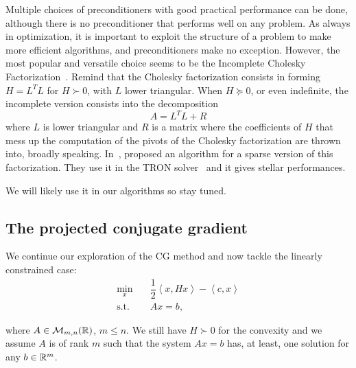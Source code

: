 \documentclass[10pt]{article}
\numberwithin{equation}{section}
\newcommand{\scal}[2]{\left\langle {#1} , {#2} \right\rangle} %
\begin{document}
	 Multiple choices of preconditioners with good practical performance can be done, although there is no preconditioner that performs well on any problem. As always in optimization, it is important to exploit the structure of a problem to make more efficient algorithms, and preconditioners make no exception. However, the most popular and versatile choice seems to be the Incomplete Cholesky Factorization~\cite{golubvanloan:2013}. Remind that the Cholesky factorization consists in forming $H=L^TL$ for $H \succ 0$, with $L$ lower triangular. When $H\succeq 0$, or even indefinite, the incomplete version consists into the decomposition
	 \[A = L^TL+R\]
	 where $L$ is lower triangular and $R$ is a matrix where the coefficients of $H$ that mess up the computation of the pivots of the Cholesky factorization are thrown into, broadly speaking. In~\cite{linmore:1999b}, proposed an algorithm for a sparse version of this factorization. They use it in the TRON solver~\cite{linmore:1999a} and it gives stellar performances.
	 
	 We will likely use it in our algorithms so stay tuned.
	 
	\subsection{The projected conjugate gradient}
	 
	 We continue our exploration of the CG method and now tackle the linearly constrained case:
	 \begin{equation}\label{eq:qp_linear_constraints}
	 	\begin{aligned}
	 		\min_x & \quad \dfrac{1}{2} \scal{x}{Hx} - \scal{c}{x} \\
	 	\text{s.t.}	& \quad Ax=b,
	 	\end{aligned}
	 \end{equation}
	 
	 where $A \in {\mathcal{M}}_{m,n}({\mathbb{R}})$, $m\le n$. We still have $H\succ 0$ for the convexity and we assume $A$ is of rank $m$ such that the system $Ax=b$ has, at least, one solution for any $b\in{\mathbb{R}}^m$. 
	 
\end{document}
